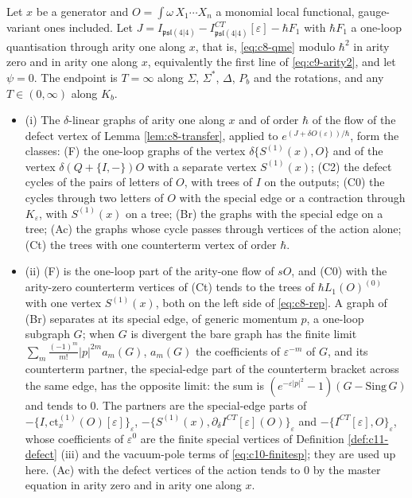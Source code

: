 \begin{theorem}
\label{thm:c11-classes}
Let $x$ be a generator and $O=\int\omega\,X_1\cdots X_n$ a monomial local functional, gauge-variant ones included. Let $J=I_{\mathfrak{psl}(4|4)}-I^{CT}_{\mathfrak{psl}(4|4)}[\varepsilon]-\hbar F_1$ with $\hbar F_1$ a one-loop quantisation through arity one along $x$, that is, \eqref{eq:c8-qme} modulo $\hbar^2$ in arity zero and in arity one along $x$, equivalently the first line of \eqref{eq:c9-arity2}, and let $\psi=0$. The endpoint is $T=\infty$ along $\Sigma$, $\Sigma^*$, $\Delta$, $P_b$ and the rotations, and any $T\in(0,\infty)$ along $K_b$.
\begin{itemize}
\item (i) The $\delta$-linear graphs of arity one along $x$ and of order $\hbar$ of the flow of the defect vertex of Lemma \ref{lem:c8-transfer}, applied to $e^{(J+\delta O(\varepsilon))/\hbar}$, form the classes: (F) the one-loop graphs of the vertex $\delta\{S^{(1)}(x),O\}$ and of the vertex $\delta(Q+\{I,-\})O$ with a separate vertex $S^{(1)}(x)$; (C2) the defect cycles of the pairs of letters of $O$, with trees of $I$ on the outputs; (C0) the cycles through two letters of $O$ with the special edge or a contraction through $K_\varepsilon$, with $S^{(1)}(x)$ on a tree; (Br) the graphs with the special edge on a tree; (Ac) the graphs whose cycle passes through vertices of the action alone; (Ct) the trees with one counterterm vertex of order $\hbar$.
\item (ii) (F) is the one-loop part of the arity-one flow of $sO$, and (C0) with the arity-zero counterterm vertices of (Ct) tends to the trees of $\hbar L_1(O)^{(0)}$ with one vertex $S^{(1)}(x)$, both on the left side of \eqref{eq:c8-rep}. A graph of (Br) separates at its special edge, of generic momentum $p$, a one-loop subgraph $G$; when $G$ is divergent the bare graph has the finite limit $\sum_m\frac{(-1)^m}{m!}|p|^{2m}a_m(G)$, $a_m(G)$ the coefficients of $\varepsilon^{-m}$ of $G$, and its counterterm partner, the special-edge part of the counterterm bracket across the same edge, has the opposite limit: the sum is $(e^{-\varepsilon|p|^2}-1)(G-\mathrm{Sing}\,G)$ and tends to $0$. The partners are the special-edge parts of $-\{I,\mathrm{ct}^{(1)}_x(O)[\varepsilon]\}_\varepsilon$, $-\{S^{(1)}(x),\partial_\delta I^{CT}[\varepsilon](O)\}_\varepsilon$ and $-\{I^{CT}[\varepsilon],O\}_\varepsilon$, whose coefficients of $\varepsilon^0$ are the finite special vertices of Definition \ref{def:c11-defect} (iii) and the vacuum-pole terms of \eqref{eq:c10-finitesp}; they are used up here. (Ac) with the defect vertices of the action tends to $0$ by the master equation in arity zero and in arity one along $x$.

\end{itemize}
\end{theorem}
